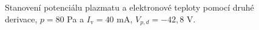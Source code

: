 \documentclass[a4paper,12pt]{article}
\begin{document}
\newpage
\begin{figure}[h]
	\centering
	\begin{subfigure}[b]{.49\textwidth}
		\centering
	\end{subfigure}
	\begin{subfigure}[b]{.49\textwidth}
		\centering
	\end{subfigure}
	\caption{Stanovení potenciálu plazmatu a elektronové teploty pomocí druhé 
	derivace, $p = 80$ 
	\si{\pascal} a $I_\text{v} = 40$ \si{\milli\ampere}, $V_{p,d} = 
	-42,8$ V.}
	\label{data4sec}
\end{figure}
\end{document}
